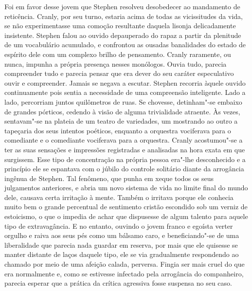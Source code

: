 Foi em favor desse jovem que Stephen resolveu desobedecer ao mandamento de
reticência.  Cranly, por seu turno, estaria acima de todas as vicissitudes da
vida, se não experimentasse uma comoção resultante daquela lisonja
delicadamente insistente.  Stephen falou ao ouvido depauperado do rapaz a
partir da plenitude de um vocabulário acumulado, e confrontou as ousadas
banalidades do estado de espírito dele com um complexo brilho de pensamento.
Cranly raramente, ou nunca, impunha a própria presença nesses monólogos.  Ouvia
tudo, parecia compreender tudo e parecia pensar que era dever do seu caráter
especulativo ouvir e compreender.  Jamais se negava a escutar.  Stephen
recorria àquele ouvido \mbox{continuamente} pois sentia a necessidade de uma
compreensão inteligente.  Lado a lado, percorriam juntos quilômetros de ruas.
Se chovesse, detinham"-se embaixo de grandes pórticos, cedendo à visão de alguma
trivialidade atraente.  Às vezes, sentavam"-se na plateia de um teatro de
variedades, um mostrando ao outro a tapeçaria dos seus intentos poéticos,
enquanto a orquestra vociferava para o comediante e o comediante vociferava
para a orquestra.  Cranly acostumou"-se a ter as suas sensações e impressões
registradas e analisadas na hora exata em que surgissem.  Esse tipo de
concentração na própria pessoa era"-lhe desconhecido e a princípio
ele se espantava com o júbilo do controle solitário diante da arrogância
ingênua de Stephen.  Tal fenômeno, que punha em xeque todos os seus julgamentos
anteriores, e abria um novo sistema de vida no limite final do mundo dele, causava certa irritação à mente. Também o
irritava porque ele conhecia muito bem o grande percentual de sentimento
cristão escondido sob um verniz de estoicismo, o que o impedia de achar que
dispusesse de algum talento para aquele tipo de extravagância.  E no entanto,
ouvindo o jovem franco e egoísta verter orgulho e raiva aos seus pés como um
bálsamo caro, e beneficiando"-se de uma liberalidade que parecia nada guardar em
reserva, por mais que ele quisesse se manter distante de laços daquele tipo,
ele se via gradualmente respondendo ao chamado por meio de uma afeição calada,
perversa.  Fingia ser mais cruel do que era normalmente e, como se estivesse
infectado pela arrogância do companheiro, parecia esperar que a prática da
crítica agressiva fosse suspensa no seu caso.

